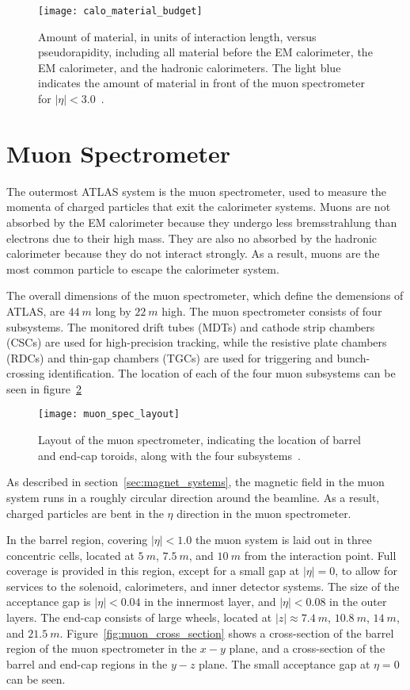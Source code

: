 \begin{figure}[!ht]\centering
\texttt{[image: calo\_material\_budget]}
\caption{Amount of material, in units of interaction length, versus pseudorapidity, including all material before the EM calorimeter, the EM calorimeter, and the hadronic calorimeters.
The light blue indicates the amount of material in front of the muon spectrometer for $|\eta| < 3.0$~\cite{atlas-detector-2008}.}
\label{fig:calo_material_budget}
\end{figure}

\section{Muon Spectrometer}\label{sec:muon_spec}

The outermost ATLAS system is the muon spectrometer, used to measure the momenta of charged particles that exit the calorimeter systems.
Muons are not absorbed by the EM calorimeter because they undergo less bremsstrahlung than electrons due to their high mass.
They are also no absorbed by the hadronic calorimeter because they do not interact strongly.
As a result, muons are the most common particle to escape the calorimeter system.

The overall dimensions of the muon spectrometer, which define the demensions of ATLAS, are $44~m$ long by $22~m$ high.
The muon spectrometer consists of four subsystems.
The monitored drift tubes (MDTs) and cathode strip chambers (CSCs) are used for high-precision tracking,
while the resistive plate chambers (RDCs) and thin-gap chambers (TGCs) are used for triggering and bunch-crossing identification.
The location of each of the four muon subsystems can be seen in figure~\ref{fig:muon_spec_layout}

\begin{figure}[!ht]\centering
\texttt{[image: muon\_spec\_layout]}
\caption{Layout of the muon spectrometer, indicating the location of barrel and end-cap toroids, along with the four subsystems~\cite{atlas-detector-2008}.}
\label{fig:muon_spec_layout}
\end{figure}

As described in section~\ref{sec:magnet_systems}, the magnetic field in the muon system runs in a roughly circular direction around the beamline.
As a result, charged particles are bent in the $\eta$ direction in the muon spectrometer.

In the barrel region, covering $|\eta| < 1.0$ the muon system is laid out in three concentric cells,
located at $5~m$, $7.5~m$, and $10~m$ from the interaction point.
Full coverage is provided in this region, except for a small gap at $|\eta| = 0$, to allow for services to the solenoid,
calorimeters, and inner detector systems.
The size of the acceptance gap is $|\eta| < 0.04$ in the innermost layer, and $|\eta| < 0.08$ in the outer layers.
The end-cap consists of large wheels, located at $|z| \approx 7.4~m$, $10.8~m$, $14~m$, and $21.5~m$.
Figure~\ref{fig:muon_cross_section} shows a cross-section of the barrel region of the muon spectrometer in the $x-y$ plane,
and a cross-section of the barrel and end-cap regions in the $y-z$ plane.
The small acceptance gap at $\eta = 0$ can be seen.

